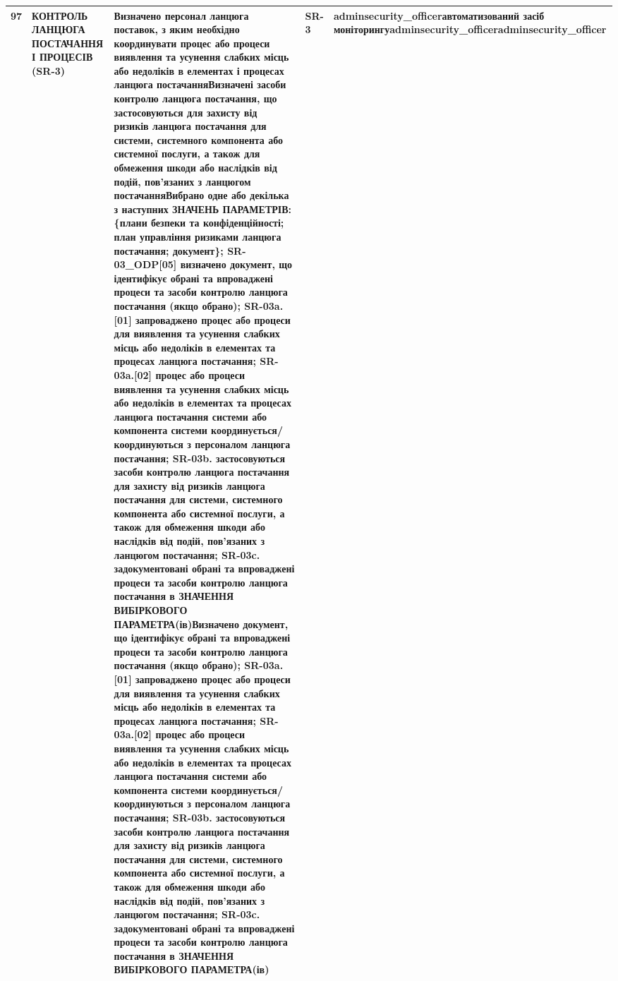 \documentclass[10pt]{article}
\begin{document}
\begin{longtable}{|c|>{\raggedright\arraybackslash}p{2.5cm}|>{\raggedright\arraybackslash}p{4cm}|>{\raggedright\arraybackslash}p{3.5cm}|>{\raggedright\arraybackslash}p{5.5cm}|}
97 & КОНТРОЛЬ ЛАНЦЮГА ПОСТАЧАННЯ І ПРОЦЕСІВ (SR-3) & Визначено персонал ланцюга поставок, з яким необхідно координувати процес або процеси виявлення та усунення слабких місць або недоліків в елементах і процесах ланцюга постачання\newline Визначені засоби контролю ланцюга постачання, що застосовуються для захисту від ризиків ланцюга постачання для системи, системного компонента або системної послуги, а також для обмеження шкоди або наслідків від подій, пов'язаних з ланцюгом постачання\newline Вибрано одне або декілька з наступних ЗНАЧЕНЬ ПАРАМЕТРІВ: \{плани безпеки та конфіденційності; план управління ризиками ланцюга постачання; документ\}; SR-03\_\allowbreak{}ODP[05] визначено документ, що ідентифікує обрані та впроваджені процеси та засоби контролю ланцюга постачання (якщо обрано); SR-03a.[01] запроваджено процес або процеси для виявлення та усунення слабких місць або недоліків в елементах та процесах ланцюга постачання; SR-03a.[02] процес або процеси виявлення та усунення слабких місць або недоліків в елементах та процесах ланцюга постачання системи або компонента системи координується/координуються з персоналом ланцюга постачання; SR-03b. застосовуються засоби контролю ланцюга постачання для захисту від ризиків ланцюга постачання для системи, системного компонента або системної послуги, а також для обмеження шкоди або наслідків від подій, пов'язаних з ланцюгом постачання; SR-03c. задокументовані обрані та впроваджені процеси та засоби контролю ланцюга постачання в ЗНАЧЕННЯ ВИБІРКОВОГО ПАРАМЕТРА(ів)\newline Визначено документ, що ідентифікує обрані та впроваджені процеси та засоби контролю ланцюга постачання (якщо обрано); SR-03a.[01] запроваджено процес або процеси для виявлення та усунення слабких місць або недоліків в елементах та процесах ланцюга постачання; SR-03a.[02] процес або процеси виявлення та усунення слабких місць або недоліків в елементах та процесах ланцюга постачання системи або компонента системи координується/координуються з персоналом ланцюга постачання; SR-03b. застосовуються засоби контролю ланцюга постачання для захисту від ризиків ланцюга постачання для системи, системного компонента або системної послуги, а також для обмеження шкоди або наслідків від подій, пов'язаних з ланцюгом постачання; SR-03c. задокументовані обрані та впроваджені процеси та засоби контролю ланцюга постачання в ЗНАЧЕННЯ ВИБІРКОВОГО ПАРАМЕТРА(ів) & SR-3 & \textbf{adminsecurity\_\allowbreak{}officer}\newline \textbf{автоматизований засіб моніторингу}\newline \textbf{adminsecurity\_\allowbreak{}officer}\newline \textbf{adminsecurity\_\allowbreak{}officer} \\ \hline


\end{longtable}
\end{document}
